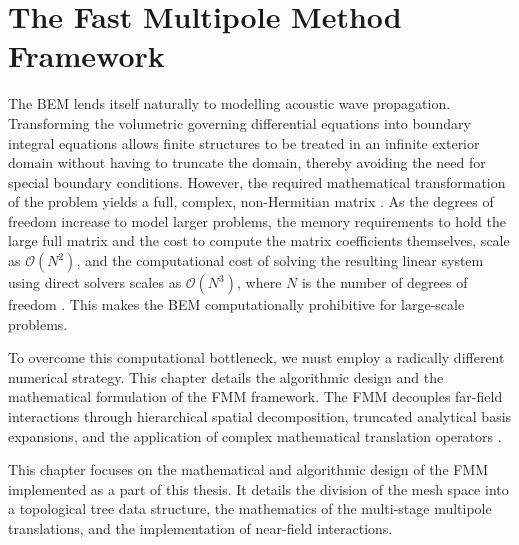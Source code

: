 \chapter{The Fast Multipole Method Framework}\label{chapter:fmm-framework}

The \ac{BEM} lends itself naturally to modelling acoustic wave propagation. Transforming the volumetric governing differential equations into boundary integral equations allows finite structures to be treated in an infinite exterior domain without having to truncate the domain, thereby avoiding the need for special boundary conditions.
However, the required mathematical transformation of the problem yields a full, complex, non-Hermitian matrix \cite{chandler-wildeboundaryelementmethods2007}. As the degrees of freedom increase to model larger problems, the memory requirements to hold the large full matrix and the cost to compute the matrix coefficients themselves, scale as $\mathcal{O}(N^2)$, and the computational cost of solving the resulting linear system using direct solvers scales as $\mathcal{O}(N^3)$, where $N$ is the number of degrees of freedom \cite{liufastmultipoleboundary2009}. This makes the \ac{BEM} computationally prohibitive for large-scale problems.

To overcome this computational bottleneck, we must employ a radically different numerical strategy. This chapter details the algorithmic design and the mathematical formulation of the \ac{FMM} framework. The \ac{FMM} decouples far-field interactions through hierarchical spatial decomposition,  truncated analytical basis expansions, and the application of complex mathematical translation operators \cite{coifmanfastmultipolemethod1993}.

This chapter focuses on the mathematical and algorithmic design of the \ac{FMM}  implemented as a part of this thesis. It details the division of the mesh space into a topological tree data structure, the mathematics of the multi-stage multipole translations, and the implementation of near-field interactions.





